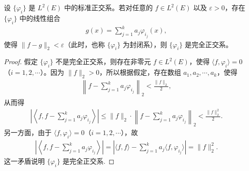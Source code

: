 \documentclass[../../main.tex]{subfiles}%
\begin{document}
\begin{theorem}
设 $\{\varphi_i\}$ 是 $L^2(E)$ 中的标准正交系。若对任意的 $f \in L^2(E)$ 以及 $\varepsilon > 0$，存在 $\{\varphi_i\}$ 中的线性组合
\begin{align*}
g(x) = \sum_{j=1}^k a_j \varphi_{i_j}(x),
\end{align*}
使得 $\|f - g\|_2 < \varepsilon$（此时，也称 $\{\varphi_i\}$ 为封闭系），则 $\{\varphi_i\}$ 是完全正交系。
\end{theorem}
\begin{proof}

假定 $\{\varphi_i\}$ 不是完全正交系，则存在非零元 $f \in L^2(E)$，使得 $\langle f, \varphi_i \rangle = 0$（$i=1,2,\cdots$）。因为 $\|f\|_2 > 0$，所以根据假定，存在数组 $a_1, a_2, \cdots, a_k$，使得
\begin{align*}
\left\| f - \sum_{j=1}^k a_j \varphi_{i_j} \right\|_2 < \frac{\|f\|_2}{2},
\end{align*}
从而得
\begin{align*}
\left| \left\langle f, f - \sum_{j=1}^k a_j \varphi_{i_j} \right\rangle \right| \leqslant \|f\|_2 \cdot \left\| f - \sum_{j=1}^k a_j \varphi_{i_j} \right\|_2 < \frac{\|f\|_2^2}{2}.
\end{align*}
另一方面，由于 $\langle f, \varphi_i \rangle = 0$（$i=1,2,\cdots$），故
\begin{align*}
\left| \left\langle f, f - \sum_{j=1}^k a_j \varphi_{i_j} \right\rangle \right| = \left| \langle f, f \rangle - \sum_{j=1}^k a_j \langle f, \varphi_{i_j} \rangle \right| = \|f\|_2^2.
\end{align*}
这一矛盾说明 $\{\varphi_i\}$ 是完全正交系.

\end{proof}
\end{document}
